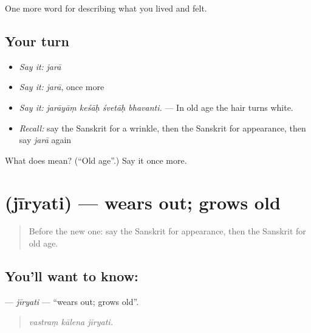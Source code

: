 \begin{grammarlens}[title={What you've built}]
One more word for describing what you lived and felt.
\end{grammarlens}

\subsection*{Your turn}
\begin{itemize}
\raggedright
  \item \emph{Say it:} \emph{jarā}
  \item \emph{Say it:} \emph{jarā}, once more
  \item \emph{Say it:} \emph{jarāyāṃ keśāḥ śvetāḥ bhavanti.} — In old age the hair turns white.
  \item \emph{Recall:} say the Sanskrit for a wrinkle, then the Sanskrit for appearance, then say \emph{jarā} again
\end{itemize}

\begin{tcolorbox}[breakable,colback=teal!4,colframe=teal!35!black,title={Before you move on}]
What does  mean? (\textquotedblleft{}Old age\textquotedblright{}.) Say it once more.
\end{tcolorbox}
\section[\texorpdfstring{\sk{जीर्यति} (jīryati)}{जीर्यति (jīryati)}]{ (jīryati) — wears out; grows old}

\label{lesson:SA-C491-jiryati}



\begin{quote}
Before the new one: say the Sanskrit for appearance, then the Sanskrit for old age.
\end{quote}

\subsection*{You'll want to know: }
\textbf{} — \emph{jīryati} — \textquotedblleft{}wears out; grows old\textquotedblright{}.

\begin{quote}
  
\end{quote}

\begin{quote}
\emph{vastraṃ kālena jīryati.}
\end{quote}

